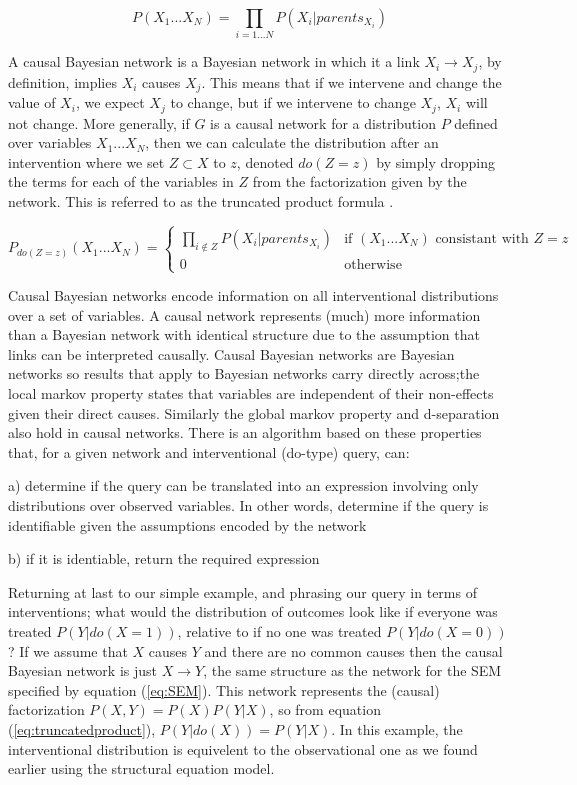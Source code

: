 \documentclass[11pt,a4paper]{article}
\begin{document}
\begin{equation}
P(X_{1}...X_{N}) = \prod_{i = 1...N}P(X_{i}|parents_{X_{i}})
\end{equation}

A causal Bayesian network is a Bayesian network in which it a link $X_{i} \rightarrow X_{j}$, by definition, implies $X_{i}$ causes $X_{j}$. This means that if we intervene and change the value of $X_{i}$, we expect $X_{j}$ to change, but if we intervene to change $X_{j}$, $X_{i}$ will not change. More generally, if $G$ is a causal network for a distribution $P$ defined over variables $X_{1}...X_{N}$, then we can calculate the distribution after an intervention where we set $Z \subset X$ to $z$, denoted $do(Z=z)$ by simply dropping the terms for each of the variables in $Z$ from the factorization given by the network. This is referred to as the truncated product formula \cite{Pearl2000}.

\begin{equation}
\label{eq:truncatedproduct}
 P_{do(Z=z)}(X_{1}...X_{N}) =
  \begin{cases}
  \prod_{i \notin Z}P(X_{i}|parents_{X_{i}}) & \text{if $(X_{1}...X_{N})$ consistant with $Z=z$}  \\
   0       & \text{otherwise } 
  \end{cases}
\end{equation}


Causal Bayesian networks encode information on all interventional distributions over a set of variables. A causal network represents (much) more information than a Bayesian network with identical structure due to the assumption that links can be interpreted causally. Causal Bayesian networks are Bayesian networks so results that apply to Bayesian networks carry directly across;the local markov property states that variables are independent of their non-effects given their direct causes. Similarly the global markov property and d-separation also hold in causal networks. There is an algorithm \cite{Shpitser2012} based on these properties that, for a given network and interventional (do-type) query, can:

a) determine if the query can be translated into an expression involving only distributions over observed variables. In other words, determine if the query is identifiable given the assumptions encoded by the network

b) if it is identiable, return the required expression

Returning at last to our simple example, and phrasing our query in terms of interventions; what would the distribution of outcomes look like if everyone was treated $P(Y|do(X=1))$, relative to if no one was treated $P(Y|do(X=0))$? If we assume that $X$ causes $Y$ and there are no common causes then the causal Bayesian network is just $X \rightarrow Y$, the same structure as the network for the SEM specified by equation (\ref{eq:SEM}). This network represents the (causal) factorization  $P(X,Y) = P(X)P(Y|X)$, so from equation (\ref{eq:truncatedproduct}), $P(Y|do(X)) = P(Y|X)$. In this example, the interventional distribution is equivelent to the observational one as we found earlier using the structural equation model. 
\end{document}
